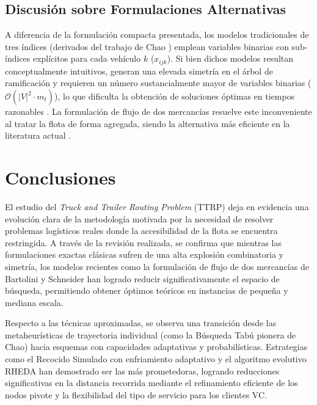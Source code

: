 \documentclass[letter, 10pt]{article}
\begin{document}
\subsection{Discusi\'on sobre Formulaciones Alternativas}
A diferencia de la formulaci\'on compacta presentada, los modelos tradicionales de tres \'indices (derivados del trabajo de Chao \cite{chao2002tabu}) emplean variables binarias con sub-\'indices expl\'icitos para cada veh\'iculo $k$ ($x_{ijk}$). Si bien dichos modelos resultan conceptualmente intuitivos, generan una elevada simetr\'ia en el \'arbol de ramificaci\'on y requieren un n\'umero sustancialmente mayor de variables binarias ($\mathcal{O}(|V|^2 \cdot m_t)$), lo que dificulta la obtenci\'on de soluciones \'optimas en tiempos razonables \cite{chao2002tabu, bartolini2020two}. La formulaci\'on de flujo de dos mercanc\'ias resuelve este inconveniente al tratar la flota de forma agregada, siendo la alternativa m\'as eficiente en la literatura actual \cite{bartolini2020two}.



\section{Conclusiones}

El estudio del \textit{Truck and Trailer Routing Problem} (TTRP) deja en evidencia una evoluci\'on clara de la metodolog\'ia motivada por la necesidad de resolver problemas log\'isticos reales donde la accesibilidad de la flota se encuentra restringida. 
A trav\'es de la revisi\'on realizada, se confirma que mientras las formulaciones exactas cl\'asicas sufren de una alta explosi\'on combinatoria y simetr\'ia, los modelos recientes como la formulaci\'on de flujo de dos mercanc\'ias de Bartolini y Schneider han logrado reducir significativamente el espacio de b\'usqueda, permitiendo obtener \'optimos te\'oricos en instancias de peque\~na y mediana escala.

\vspace{0.25cm}

Respecto a las t\'ecnicas aproximadas, se observa una transici\'on desde las metaheur\'isticas de trayectoria individual (como la B\'usqueda Tab\'u pionera de Chao) hacia esquemas con capacidades adaptativas y probabil\'isticas. 
Estrategias como el Recocido Simulado con enfriamiento adaptativo y el algoritmo evolutivo RHEDA han demostrado ser las m\'as prometedoras, logrando reducciones significativas en la distancia recorrida mediante el refinamiento eficiente de los nodos pivote y la flexibilidad del tipo de servicio para los clientes VC.
\end{document}
